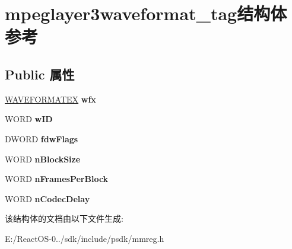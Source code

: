 \hypertarget{structmpeglayer3waveformat__tag}{}\section{mpeglayer3waveformat\+\_\+tag结构体 参考}
\label{structmpeglayer3waveformat__tag}
\subsection*{Public 属性}
\begin{DoxyCompactItemize}
\item 
\mbox{\label{structmpeglayer3waveformat__tag_a63ab8d2c7d4d227495fcd1d1b0f7ca48}} 
\hyperlink{struct_w_a_v_e_f_o_r_m_a_t_e_x}{W\+A\+V\+E\+F\+O\+R\+M\+A\+T\+EX} {\bfseries wfx}
\item 
\mbox{\label{structmpeglayer3waveformat__tag_a2f864cb6c347d498ade901fdd9c86c11}} 
W\+O\+RD {\bfseries w\+ID}
\item 
\mbox{\label{structmpeglayer3waveformat__tag_ab4a509cbb511f6a7c8f1b6a94f1c7367}} 
D\+W\+O\+RD {\bfseries fdw\+Flags}
\item 
\mbox{\label{structmpeglayer3waveformat__tag_a9da6338dfaaeede8f5324b2f6ee0add1}} 
W\+O\+RD {\bfseries n\+Block\+Size}
\item 
\mbox{\label{structmpeglayer3waveformat__tag_a97e8e51dcf0bfb469c5703e1726b7b86}} 
W\+O\+RD {\bfseries n\+Frames\+Per\+Block}
\item 
\mbox{\label{structmpeglayer3waveformat__tag_a45feed93f9e454ca6295887fb428c942}} 
W\+O\+RD {\bfseries n\+Codec\+Delay}
\end{DoxyCompactItemize}


该结构体的文档由以下文件生成\+:\begin{DoxyCompactItemize}
\item 
E\+:/\+React\+O\+S-\/0../sdk/include/psdk/mmreg.\+h\end{DoxyCompactItemize}

